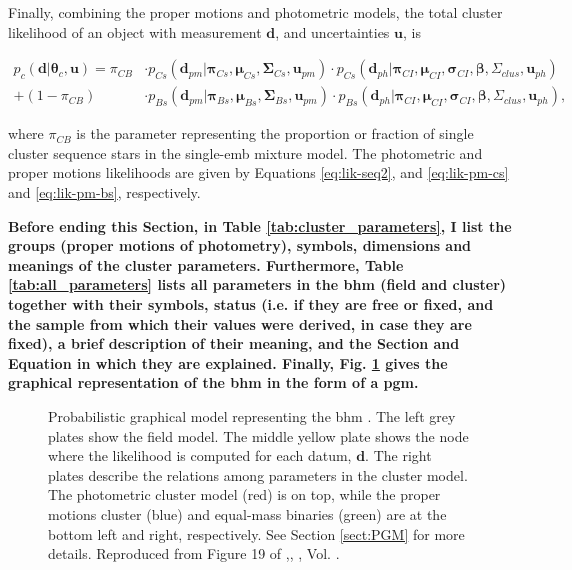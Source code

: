 Finally, combining the proper motions and photometric models, the total cluster likelihood of an object with measurement $\mathbf{d}$, and uncertainties $\mathbf{u}$, is

\begin{align}
p_c(\mathbf{d}|\boldsymbol{\theta}_c,\mathbf{u})=\pi_{CB}&\cdot p_{Cs}(\mathbf{d}_{pm}| \boldsymbol{\pi}_{Cs}, \boldsymbol{\mu}_{Cs},\boldsymbol{\Sigma}_{Cs},\mathbf{u}_{pm}) \cdot  p_{Cs}(\mathbf{d}_{ph}|\boldsymbol{\pi}_{CI},\boldsymbol{\mu}_{CI},\boldsymbol{\sigma}_{CI},\boldsymbol{\beta},\Sigma_{clus},\mathbf{u}_{ph})\nonumber\\
+(1-\pi_{CB})&\cdot p_{Bs}(\mathbf{d}_{pm}| \boldsymbol{\pi}_{Bs}, \boldsymbol{\mu}_{Bs},\boldsymbol{\Sigma}_{Bs},\mathbf{u}_{pm}) \cdot  p_{Bs}(\mathbf{d}_{ph}|\boldsymbol{\pi}_{CI},\boldsymbol{\mu}_{CI},\boldsymbol{\sigma}_{CI}, \boldsymbol{\beta},\Sigma_{clus}, \mathbf{u}_{ph}),
\end{align}

where $\pi_{CB}$ is the parameter representing the proportion or fraction of single cluster sequence stars in the single-\gls{emb} mixture model. The photometric and proper motions likelihoods are given by Equations \ref{eq:lik-seq2}, and \ref{eq:lik-pm-cs} and \ref{eq:lik-pm-bs}, respectively.

\textbf{Before ending this Section, in Table \ref{tab:cluster_parameters}, I list the groups (proper motions of photometry), symbols, dimensions and meanings of the cluster parameters. Furthermore, Table \ref{tab:all_parameters} lists all parameters in the \gls{bhm} (field and cluster) together with their symbols, status (i.e. if they are free or fixed, and the sample from which their values were derived, in case they are fixed), a brief description of their meaning, and the Section and Equation in which they are explained. Finally, Fig. \ref{fig:PGMBHM} gives the graphical representation of the \gls{bhm} in the form of a \gls{pgm}.}







\begin{figure}[ht!]
  \begin{center}
  \resizebox{0.8\textwidth}{!}{}
  \end{center}
  \caption{Probabilistic graphical model representing the \gls{bhm} . The left grey plates show the field model. The middle yellow plate shows the node where the likelihood is computed for each datum, $\boldsymbol{d}$. The right plates describe the relations among parameters in the cluster model. The photometric cluster model (red) is on top, while the proper motions cluster (blue) and equal-mass binaries (green) are at the bottom left and right, respectively. See Section \ref{sect:PGM} for more details. Reproduced from Figure 19 of \citet{Olivares2017},\textit{}, , Vol. .}
  \label{fig:PGMBHM}
\end{figure}

